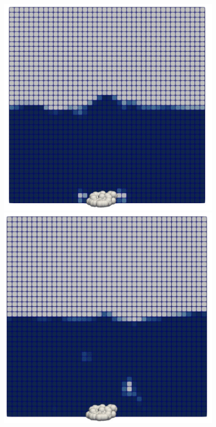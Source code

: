 \begin{figure}[!ht]
\begin{minipage}{.5\textwidth}
    \end{minipage}
    \newline
    \begin{minipage}{.5\textwidth}
        \centering
        \includegraphics[width=\linewidth]{GWU_Thesis_Sarmakeeva/Images/chap4/clump_3.png}
    \end{minipage}%
    \begin{minipage}{.5\textwidth}
        \centering
        \includegraphics[width=\linewidth]{GWU_Thesis_Sarmakeeva/Images/chap4/clump_4.png}

\end{minipage}
\end{figure}
